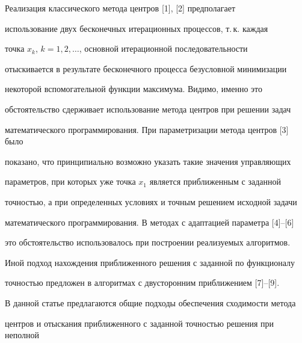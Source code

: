 

\pagestyle{plain} %







\maketitle


\label{begin}





Реализация классического метода центров [1], [2] предполагает


использование двух бесконечных итерационных процессов, т.\,к. каждая


точка $x_k$, $k=1,2,\dotsc$, основной итерационной последовательности


отыскивается в результате бесконечного процесса безусловной минимизации


некоторой вспомогательной функции максимума. Видимо, именно это


обстоятельство сдерживает использование метода центров при решении задач


математического программирования. При параметризации метода центров [3] было


показано, что принципиально возможно указать такие значения управляющих


параметров, при которых уже точка $x_1$ является приближенным с заданной


точностью, а при определенных условиях и точным решением исходной задачи


математического программирования. В методах с адаптацией параметра [4]--[6]


это обстоятельство использовалось при построении реализуемых алгоритмов.


Иной подход нахождения приближенного решения с заданной по функционалу


точностью предложен в алгоритмах с двусторонним приближением [7]--[9].





В данной статье предлагаются общие подходы обеспечения сходимости метода


центров и отыскания приближенного с заданной точностью решения при неполной 


